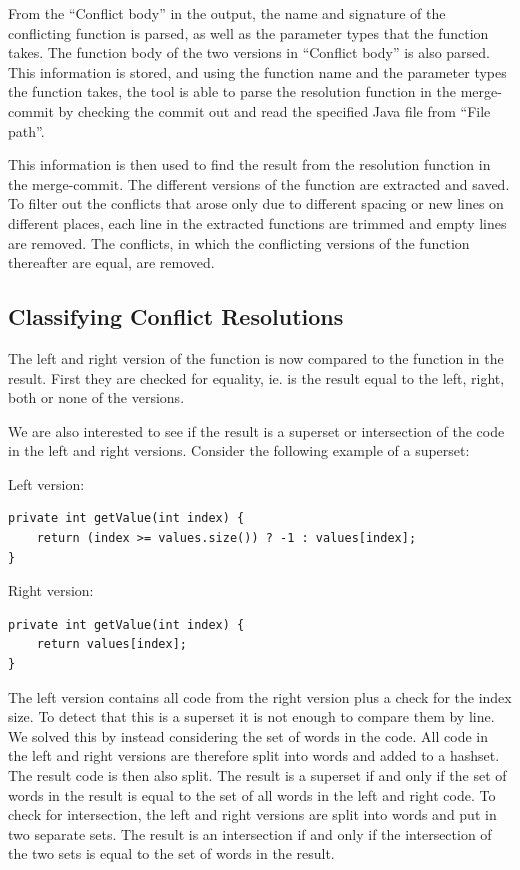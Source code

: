 From the “Conflict body” in the output, the name and signature of the conflicting function is parsed, as well as the parameter types that the function takes. The function body of the two versions in “Conflict body” is also parsed. This information is stored, and using the function name and the parameter types the function takes, the tool is able to parse the resolution function in the merge-commit by checking the commit out and read the specified Java file from “File path”.

This information is then used to find the result from the resolution function in the merge-commit. The different versions of the function are extracted and saved. To filter out the conflicts that arose only due to different spacing or new lines on different places, each line in the extracted functions are trimmed and empty lines are removed. The conflicts, in which the conflicting versions of the function thereafter are equal, are removed.

\subsection{Classifying Conflict Resolutions}
The left and right version of the function is now compared to the function in the result. First they are checked for equality, ie. is the result equal to the left, right, both or none of the versions.

We are also interested to see if the result is a superset or intersection of the code in the left and right versions. Consider the following example of a superset:

Left version:
\lstset{language=Java,numbers=left,xleftmargin=2em,frame=single,framexleftmargin=1.5em}
\begin{lstlisting}[frame=single]
private int getValue(int index) {
	return (index >= values.size()) ? -1 : values[index];
}
\end{lstlisting}

Right version:
\lstset{language=Java,numbers=left,xleftmargin=2em,frame=single,framexleftmargin=1.5em}
\begin{lstlisting}[frame=single]
private int getValue(int index) {
	return values[index];
}
\end{lstlisting}

The left version contains all code from the right version plus a check for the index size. To detect that this is a superset it is not enough to compare them by line. We solved this by instead considering the set of words in the code. All code in the left and right versions are therefore split into words and added to a hashset. The result code is then also split. The result is a superset if and only if the set of words in the result is equal to the set of all words in the left and right code. To check for intersection, the left and right versions are split into words and put in two separate sets. The result is an intersection if and only if the intersection of the two sets is equal to the set of words in the result.

